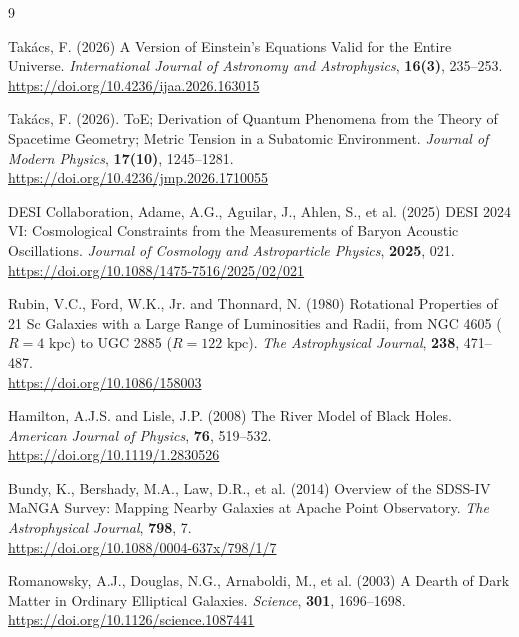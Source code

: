 \documentclass[11pt,a4paper]{article}
\begin{document}
\begin{thebibliography}{9}
	
	Tak\'acs, F. (2026) A Version of Einstein's Equations Valid for the Entire Universe. \textit{International Journal of Astronomy and Astrophysics}, \textbf{16(3)}, 235--253. \\
	\url{https://doi.org/10.4236/ijaa.2026.163015}
	
	Tak\'acs, F. (2026). ToE; Derivation of Quantum Phenomena from the Theory of Spacetime Geometry; Metric Tension in a Subatomic Environment.
	\textit{Journal of Modern Physics}, \textbf{17(10)}, 1245–1281.\\ \url{https://doi.org/10.4236/jmp.2026.1710055}
	
	DESI Collaboration, Adame, A.G., Aguilar, J., Ahlen, S., et al. (2025) DESI 2024 VI: Cosmological Constraints from the Measurements of Baryon Acoustic Oscillations. \textit{Journal of Cosmology and Astroparticle Physics}, \textbf{2025}, 021. \\
	\url{https://doi.org/10.1088/1475-7516/2025/02/021}
	
	Rubin, V.C., Ford, W.K., Jr. and Thonnard, N. (1980) Rotational Properties of 21 Sc Galaxies with a Large Range of Luminosities and Radii, from NGC 4605 ($R = 4\text{ kpc}$) to UGC 2885 ($R = 122\text{ kpc}$). \textit{The Astrophysical Journal}, \textbf{238}, 471--487. \\
	\url{https://doi.org/10.1086/158003}
	
	Hamilton, A.J.S. and Lisle, J.P. (2008) The River Model of Black Holes. \textit{American Journal of Physics}, \textbf{76}, 519--532. \\
	\url{https://doi.org/10.1119/1.2830526}
	
	Bundy, K., Bershady, M.A., Law, D.R., et al. (2014) Overview of the SDSS-IV MaNGA Survey: Mapping Nearby Galaxies at Apache Point Observatory. \textit{The Astrophysical Journal}, \textbf{798}, 7. \\
	\url{https://doi.org/10.1088/0004-637x/798/1/7}
	
	Romanowsky, A.J., Douglas, N.G., Arnaboldi, M., et al. (2003) A Dearth of Dark Matter in Ordinary Elliptical Galaxies. \textit{Science}, \textbf{301}, 1696--1698. \\
	\url{https://doi.org/10.1126/science.1087441}
	
\end{thebibliography}
\end{document}
